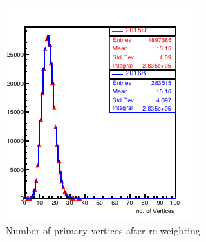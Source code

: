 \begin{figure}[ht]
\hspace{0.5cm}
\begin{minipage}[b]{0.5\linewidth}
\centering
\includegraphics[width=0.99\linewidth]{../Figures/Chap2/ImageFiles_HF/BasicPics/Comp2015vs2016B/nVtx2015DPUwt_2016B.pdf}
\captionsetup{width=.9\linewidth}
\caption{Number of primary vertices after re-weighting}
\label{nVtx2015DPUwt_2016B}
\end{minipage}
\end{figure}

